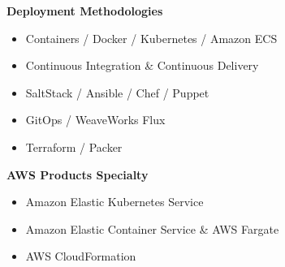 \textbf{Deployment Methodologies}
\vspace{-7pt}
\begin{itemize}
    \item Containers / Docker / Kubernetes / Amazon ECS
    \item Continuous Integration \& Continuous Delivery
    \item SaltStack / Ansible / Chef / Puppet
    \item GitOps / WeaveWorks Flux
    \item Terraform / Packer
\end{itemize}

\textbf{AWS Products Specialty}
\vspace{-7pt}
\begin{itemize}
    \item Amazon Elastic Kubernetes Service
    \item Amazon Elastic Container Service \& AWS Fargate
    \item AWS CloudFormation
\end{itemize}
